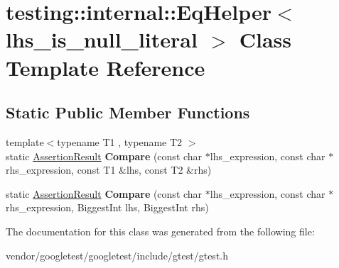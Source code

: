 \hypertarget{classtesting_1_1internal_1_1EqHelper}{}\section{testing\+:\+:internal\+:\+:Eq\+Helper$<$ lhs\+\_\+is\+\_\+null\+\_\+literal $>$ Class Template Reference}
\label{classtesting_1_1internal_1_1EqHelper}
\subsection*{Static Public Member Functions}
\begin{DoxyCompactItemize}
\item 
{\footnotesize template$<$typename T1 , typename T2 $>$ }\\static \hyperlink{classtesting_1_1AssertionResult}{Assertion\+Result} {\bfseries Compare} (const char $\ast$lhs\+\_\+expression, const char $\ast$rhs\+\_\+expression, const T1 \&lhs, const T2 \&rhs)\hypertarget{classtesting_1_1internal_1_1EqHelper_ae3572c7374534a916b9117efaa89f33f}{}\label{classtesting_1_1internal_1_1EqHelper_ae3572c7374534a916b9117efaa89f33f}

\item 
static \hyperlink{classtesting_1_1AssertionResult}{Assertion\+Result} {\bfseries Compare} (const char $\ast$lhs\+\_\+expression, const char $\ast$rhs\+\_\+expression, Biggest\+Int lhs, Biggest\+Int rhs)\hypertarget{classtesting_1_1internal_1_1EqHelper_aaa42c0059bb3dcc43d556243febb5f1c}{}\label{classtesting_1_1internal_1_1EqHelper_aaa42c0059bb3dcc43d556243febb5f1c}

\end{DoxyCompactItemize}


The documentation for this class was generated from the following file\+:\begin{DoxyCompactItemize}
\item 
vendor/googletest/googletest/include/gtest/gtest.\+h\end{DoxyCompactItemize}
